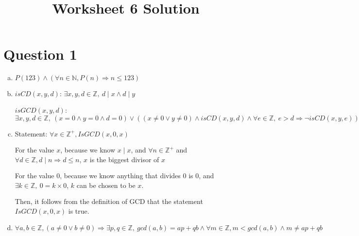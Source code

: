 \documentclass[12pt]{article}
\begin{document}
\title{Worksheet 6 Solution}
\maketitle

\section*{Question 1}
\begin{enumerate}[a.]
    \item

    $P(123) \land (\forall n \in \mathbb{N}, P(n) \Rightarrow n \leq 123)$

    \item

    $isCD(x,y,d)$: $\exists x,y,d \in \mathbb{Z},\:d \mid x \land d \mid y$

    $isGCD(x,y,d)$: $\exists x,y,d \in \mathbb{Z},\:(x = 0 \land y = 0 \land d = 0)
    \lor ((x \neq 0 \lor y \neq 0) \land isCD(x,y,d) \land \forall e \in \mathbb{Z}, \:e > d \Rightarrow \neg isCD(x,y,e))$

    \item

    Statement: $\forall x \in \mathbb{Z}^{+}, IsGCD(x,0,x)$

    \bigskip

    For the value $x$, because we know $x \mid x$, and $\forall n \in \mathbb{Z}^{+}$ and $\forall
    d \in \mathbb{Z}, d \mid n \Rightarrow d \leq n$, $x$ is the biggest divisor of $x$

    For the value $0$, because we know anything that divides 0 is 0, and
    $\exists k \in \mathbb{Z},\: 0 = k \times 0$, $k$ can be chosen to be $x$.

    Then, it follows from the definition of GCD that the statement $IsGCD(x,0,x)$ is true.

    \item

    $\forall a,b \in \mathbb{Z}, (a \neq 0 \lor b \neq 0) \Rightarrow \exists p,q \in \mathbb{Z},\:gcd(a,b) = ap + qb \land \forall m \in \mathbb{Z}, m < gcd(a,b) \land m \neq ap + qb$


\end{enumerate}
\end{document}
